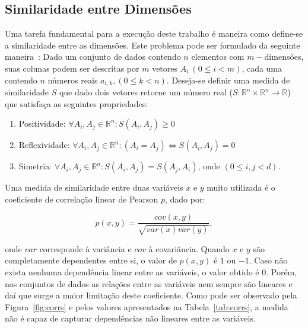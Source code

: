 \subsection{Similaridade entre Dimensões}\label{ss:sim}

Uma tarefa fundamental para a execução deste trabalho é maneira como define-se a            similaridade entre as dimensões. Este problema pode ser formulado da seguinte maneira~\cite{Ankerst1998}: Dado um conjunto de dados contendo $n$ elementos com $m-$dimensões, suas colunas podem ser descritas por $m$ vetores $A_i~(0 \leq i < m)$, cada uma contendo $n$ números reais $a_{i,k}, (0 \leq k < n)$. Deseja-se definir uma medida de similaridade $S$ que dado dois vetores retorne um número real ($S : \mathbb{R}^n \times \mathbb{R}^n \rightarrow \mathbb{R}$) que satisfaça as seguintes propriedades:

\begin{enumerate}

    \item Positividade: $\forall A_i,A_j \in \mathbb{R}^n: S(A_i,A_j) \geq 0 $

    \item Reflexividade: $\forall A_i,A_j \in \mathbb{R}^n: (A_i = A_j) \Leftrightarrow S(A_i,A_j) = 0 $

    \item Simetria: $\forall A_i,A_j \in \mathbb{R}^n: S(A_i,A_j) = S(A_j,A_i)$, onde $(0 \leq i,j < d)$.

\end{enumerate}

Uma medida de similaridade entre duas variáveis $x$ e $y$ muito utilizada é o coeficiente de correlação linear de Pearson $p$, dado por:

\begin{equation}
    p(x,y) = \frac{cov(x,y)}{\sqrt{var(x)var(y)}},
\end{equation}

\noindent onde $var$ corresponde à variância e $cov$ à covariância. Quando $x$ e $y$ são completamente dependentes entre si, o valor de $p(x,y)$ é $1$ ou $-1$. Caso não exista nenhuma dependência linear entre as variáveis, o valor obtido é $0$. Porém, nos conjuntos de dados as relações entre as variáveis nem sempre são lineares e daí que surge a maior limitação deste coeficiente. Como pode ser observado pela Figura~\ref{fig:corrs} e pelos valores apresentados na Tabela~\ref{tab:corrs}, a medida não é capaz de capturar dependências não lineares entre as variáveis. 

